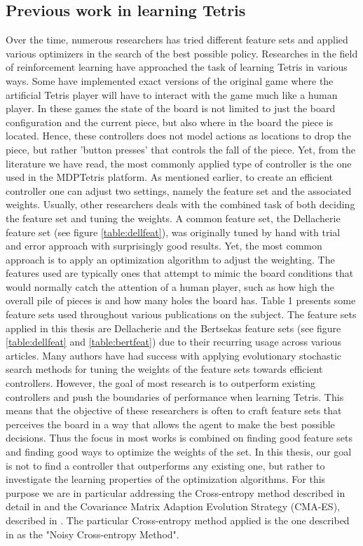 \subsection{Previous work in learning Tetris\label{prevWork}}
Over the time, numerous researchers has tried different feature 
sets and applied various optimizers in the search of the best 
possible policy. Researches in the field
of reinforcement learning have approached the task of learning Tetris
in various ways. Some have implemented exact versions of the original game
where the artificial Tetris player will have to interact with the 
game much like a human player. In these games the state of the board is not limited
to just the board configuration and the current piece, but also where in the 
board the piece is located. Hence, these controllers does not model actions 
as locations to drop the piece, but rather 'button presses' that controls the
fall of the piece. Yet, from the literature we have read, the most commonly applied 
type of controller is the one used in the MDPTetris platform. As mentioned earlier,
to create an efficient controller one can adjust two settings, namely the feature set 
and the associated weights. 
Usually, other researchers deals with the combined task of both
deciding the feature set and tuning the weights. A common 
feature set, the Dellacherie feature set (see figure \ref{table:dellfeat}),
was originally tuned by hand with trial and error approach with surprisingly 
good results. Yet, the most common approach is to apply an optimization 
algorithm to adjust the weighting.
The features used are typically
ones that attempt to mimic the board conditions that would
normally catch the attention of a human player, such as
how high the overall pile of pieces is and how many holes 
the board has. Table 1 \citep{scherrer2009:b}
presents some feature sets used throughout various publications
on the subject. The feature sets applied in this thesis are 
Dellacherie and the Bertsekas feature sets 
(see figure \ref{table:dellfeat} and \ref{table:bertfeat}) due 
to their recurring usage across various articles.
Many authors have had success
with applying evolutionary stochastic search methods for tuning 
the weights of the feature sets towards
efficient controllers. However, the goal of most research 
is to outperform existing controllers and push the boundaries
of performance when learning Tetris. This means that the objective of
these researchers is often to craft feature sets that perceives the 
board in a way that allows the agent to make the best possible decisions.
Thus the focus in most works is combined on finding good feature sets and 
finding good ways to optimize the weights of the set. In this thesis,
our goal is not to find a controller that outperforms any existing one,
but rather to investigate the learning properties of the optimization algorithms.
For this purpose
we are in particular addressing the
Cross-entropy method described in detail in \citep{cetut2014} and the
Covariance Matrix Adaption Evolution Strategy (CMA-ES), described 
in \citep{hansen2011}. The particular Cross-entropy method applied 
is the one described in \citep{szita:06} as the "Noisy Cross-entropy Method".\\

